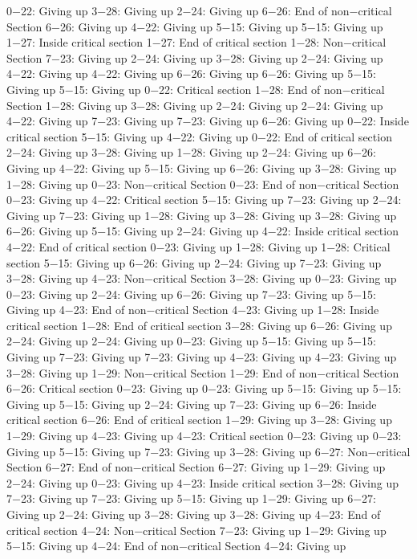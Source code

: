 0−22: Giving up
3−28: Giving up
2−24: Giving up
6−26: End of non−critical Section
6−26: Giving up
4−22: Giving up
5−15: Giving up
5−15: Giving up
1−27: Inside critical section
1−27: End of critical section
1−28: Non−critical Section
7−23: Giving up
2−24: Giving up
3−28: Giving up
2−24: Giving up
4−22: Giving up
4−22: Giving up
6−26: Giving up
6−26: Giving up
5−15: Giving up
5−15: Giving up
0−22: Critical section
1−28: End of non−critical Section
1−28: Giving up
3−28: Giving up
2−24: Giving up
2−24: Giving up
4−22: Giving up
7−23: Giving up
7−23: Giving up
6−26: Giving up
0−22: Inside critical section
5−15: Giving up
4−22: Giving up
0−22: End of critical section
2−24: Giving up
3−28: Giving up
1−28: Giving up
2−24: Giving up
6−26: Giving up
4−22: Giving up
5−15: Giving up
6−26: Giving up
3−28: Giving up
1−28: Giving up
0−23: Non−critical Section
0−23: End of non−critical Section
0−23: Giving up
4−22: Critical section
5−15: Giving up
7−23: Giving up
2−24: Giving up
7−23: Giving up
1−28: Giving up
3−28: Giving up
3−28: Giving up
6−26: Giving up
5−15: Giving up
2−24: Giving up
4−22: Inside critical section
4−22: End of critical section
0−23: Giving up
1−28: Giving up
1−28: Critical section
5−15: Giving up
6−26: Giving up
2−24: Giving up
7−23: Giving up
3−28: Giving up
4−23: Non−critical Section
3−28: Giving up
0−23: Giving up
0−23: Giving up
2−24: Giving up
6−26: Giving up
7−23: Giving up
5−15: Giving up
4−23: End of non−critical Section
4−23: Giving up
1−28: Inside critical section
1−28: End of critical section
3−28: Giving up
6−26: Giving up
2−24: Giving up
2−24: Giving up
0−23: Giving up
5−15: Giving up
5−15: Giving up
7−23: Giving up
7−23: Giving up
4−23: Giving up
4−23: Giving up
3−28: Giving up
1−29: Non−critical Section
1−29: End of non−critical Section
6−26: Critical section
0−23: Giving up
0−23: Giving up
5−15: Giving up
5−15: Giving up
5−15: Giving up
2−24: Giving up
7−23: Giving up
6−26: Inside critical section
6−26: End of critical section
1−29: Giving up
3−28: Giving up
1−29: Giving up
4−23: Giving up
4−23: Critical section
0−23: Giving up
0−23: Giving up
5−15: Giving up
7−23: Giving up
3−28: Giving up
6−27: Non−critical Section
6−27: End of non−critical Section
6−27: Giving up
1−29: Giving up
2−24: Giving up
0−23: Giving up
4−23: Inside critical section
3−28: Giving up
7−23: Giving up
7−23: Giving up
5−15: Giving up
1−29: Giving up
6−27: Giving up
2−24: Giving up
3−28: Giving up
3−28: Giving up
4−23: End of critical section
4−24: Non−critical Section
7−23: Giving up
1−29: Giving up
5−15: Giving up
4−24: End of non−critical Section
4−24: Giving up
